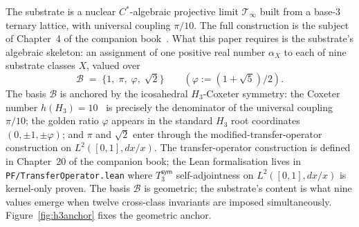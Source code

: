 \documentclass[11pt,a4paper]{amsart}
\theoremstyle{plain}
\theoremstyle{definition}
\begin{document}
The substrate is a nuclear $C^{*}$-algebraic projective limit $\mathcal{T}_\infty$ built from a base-$3$ ternary lattice, with universal coupling $\pi/10$. The full construction is the subject of Chapter~4 of the companion book~\cite{cohen2026book}. What this paper requires is the substrate's algebraic skeleton: an assignment of one positive real number $\alpha_X$ to each of nine substrate classes $X$, valued over
\[
\mathcal{B} \;=\; \{1,\;\pi,\;\varphi,\;\sqrt{2}\} \qquad (\varphi := (1+\sqrt{5})/2).
\]
The basis $\mathcal{B}$ is anchored by the icosahedral $H_3$-Coxeter symmetry: the Coxeter number $h(H_3) = 10$~\cite{bourbaki1968} is precisely the denominator of the universal coupling $\pi/10$; the golden ratio $\varphi$ appears in the standard $H_3$ root coordinates $(0, \pm 1, \pm \varphi)$; and $\pi$ and $\sqrt{2}$ enter through the modified-transfer-operator construction on $L^2([0,1], dx/x)$. The transfer-operator construction is defined in Chapter~20 of the companion book; the Lean formalisation lives in \texttt{PF/TransferOperator.lean} where $T_3^{\textsf{sym}}$ self-adjointness on $L^2([0,1], dx/x)$ is kernel-only proven. The basis $\mathcal{B}$ is geometric; the substrate's content is what nine values emerge when twelve cross-class invariants are imposed simultaneously. Figure~\ref{fig:h3anchor} fixes the geometric anchor.
\end{document}
